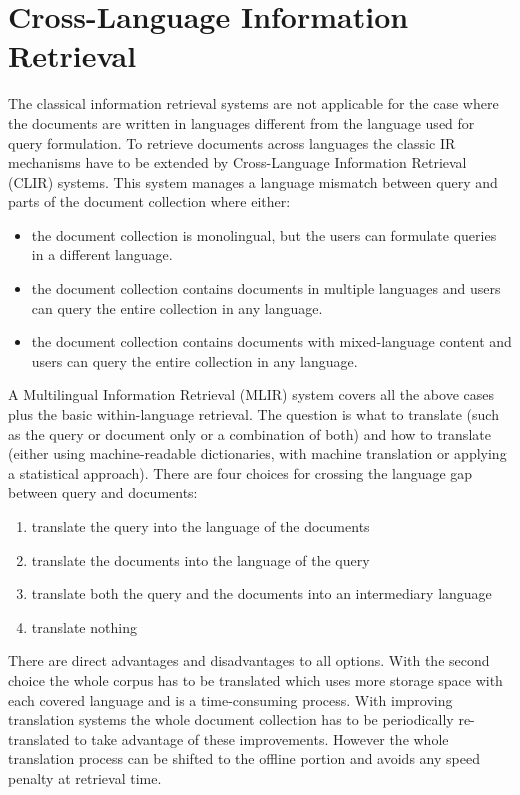 \documentclass[journal]{IEEEtran}
\begin{document}
\section{Cross-Language Information Retrieval}
\label{sec:clir}
The classical information retrieval systems are not applicable for the case where the documents are written in languages different from the language used for query formulation.
To retrieve documents across languages the classic IR mechanisms have to be extended by Cross-Language Information Retrieval (CLIR) systems.
This system manages a language mismatch between query and parts of the document collection where either:
\begin{itemize}
	\item the document collection is monolingual, but the users can formulate queries in a different language.
	\item the document collection contains documents in multiple languages and users can query the entire collection in any language.
	\item the document collection contains documents with mixed-language content and users can query the entire collection in any language.
\end{itemize}
A Multilingual Information Retrieval (MLIR) system covers all the above cases plus the basic within-language retrieval.
The question is what to translate (such as the query or document only or a combination of both) and how to translate (either using machine-readable dictionaries, with machine translation or applying a statistical approach).
There are four choices for crossing the language gap between query and documents:
\begin{enumerate}
	\item translate the query into the language of the documents
	\item translate the documents into the language of the query
	\item translate both the query and the documents into an intermediary language
	\item translate nothing
\end{enumerate}
There are direct advantages and disadvantages to all options.
With the second choice the whole corpus has to be translated which uses more storage space with each covered language and is a time-consuming process.
With improving translation systems the whole document collection has to be periodically re-translated to take advantage of these improvements.
However the whole translation process can be shifted to the offline portion and avoids any speed penalty at retrieval time.
\end{document}
